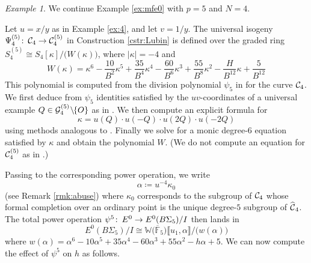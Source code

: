 \documentclass{gtpart}
\theoremstyle{definition}
\theoremstyle{remark}
\newtheorem{ex}[equation]{Example}
\def\co{\colon\thinspace}
\newcommand{\mb}[1]{\mathbb{#1}}
\newcommand{\cF}{\overline {\mb F}}
\newcommand{\CC}{{\cal C}}
\newcommand{\CG}{{\cal G}}
\newcommand{\BW}{{\mb W}}
\newcommand{\HCC}{\widehat{~\!\!\CC}}
\newcommand{\A}{\alpha}
\newcommand{\K}{\kappa}
\newcommand{\ce}{\coloneqq}
\newcommand{\lb}{\llbracket}
\newcommand{\rb}{\rrbracket}
\renewcommand{\=}{\approx}
\renewcommand{\-}{\sim}
\numberwithin{equation}{section}
\begin{document}
\begin{ex}
 \label{ex:po}
 We continue Example \ref{ex:mfe0} with $p = 5$ and $N = 4$.  

 Let $u = x / y$ as in Example \ref{ex:4}, and let $v = 1 / y$.  The universal 
 isogeny $\Psi_4^{(5)} \co \CC_4 \to \CC_4^{(5)}$ in Construction 
 \ref{cstr:Lubin} is defined over the graded ring 
 $S_4^{(5)} \cong S_4[\K] / \big(W(\K)\big)$, where $|\K| = -4$ and 
 \begin{equation}
  \label{W}
  W(\K) = \K^6 - \frac{10}{B^2} \K^5 + \frac{35}{B^4} \K^4 - \frac{60}{B^6} \K^3 
  + \frac{55}{B^8} \K^2 - \frac{H}{B^{12}} \K + \frac{5}{B^{12}} 
 \end{equation}
 This polynomial is computed from the division polynomial $\psi_5$ in 
 \cite[Exercise 3.7]{AEC} for the curve $\CC_4$.  We first deduce from $\psi_5$ 
 identities satisfied by the $uv$-coordinates of a universal example 
 $Q \in \CG_4^{(5)} \!\setminus\!\! \{O\}$ as in 
 \cite[proof of Proposition 2.2]{p3}.  We then compute an explicit formula for 
 \[
  \K = u(Q) \cdot u(-Q) \cdot u(2 Q) \cdot u(-2 Q) 
 \]
 using methods analogous to \cite[III.2.3]{AEC}.  Finally we solve for a monic 
 degree-6 equation satisfied by $\K$ and obtain the polynomial $W$.  (We do not 
 compute an equation for $\CC_4^{(5)}$ as in \cite[Proposition 2.3]{p3}.)  

 Passing to the corresponding power operation, we write 
 \begin{equation}
  \label{A}
  \A \ce u^{-4} \K_0 
 \end{equation}
 (see Remark \ref{rmk:abuse}) where $\K_0$ corresponds to the subgroup of 
 $\CC_4$ whose formal completion over an ordinary point is the unique degree-$5$ 
 subgroup of $\HCC_4$.  The total power operation 
 $\psi^5 \co E^0 \to E^0(B\Sigma_5) / I$ then lands in 
 \[
  E^0(B\Sigma_5) / I \cong 
  \BW \big( \cF_5 \big) \lb u_1, \A \rb / \big(w(\A)\big) 
 \]
 where $w(\A) = \A^6 - 10 \A^5 + 35 \A^4 - 60 \A^3 + 55 \A^2 - h \A + 5$.  We 
 can now compute the effect of $\psi^5$ on $h$ as follows.  


\end{ex}
\end{document}
